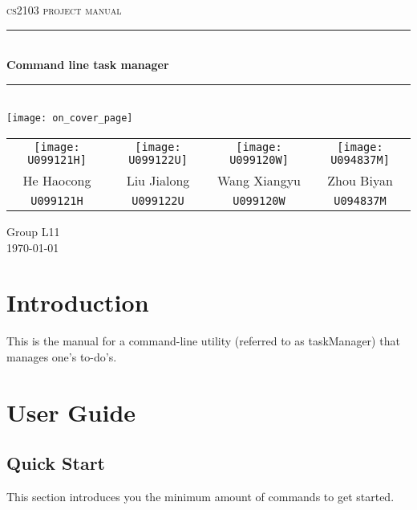 \documentclass[12pt, a4paper]{article}
\begin{document}
\begin{titlepage}
  \centering

  \textsc{\LARGE cs2103 project manual}
  \\[1.5cm]
  \hrule
  \\[0.5cm]
  \Large \bfseries Command line task manager
  \\[0.4cm]
  \hrule
  \\[1.4cm]
  \texttt{[image: on\_cover\_page]}
  \\[1.1cm]

  \begin{tabular}{c | c | c | c}
    \texttt{[image: U099121H]}&
    \texttt{[image: U099122U]}&
    \texttt{[image: U099120W]}&
    \texttt{[image: U094837M]}\\

    \small{He Haocong} & \small{Liu Jialong} & \small{Wang Xiangyu} & \small{Zhou Biyan}\\
    \small{\texttt{U099121H}} & \small{\texttt{U099122U}} & \small{\texttt{U099120W}} & \small{\texttt{U094837M}}\\
  \end{tabular}

  \vfill
  {\large Group L11\\ \today}
\end{titlepage}

\tableofcontents
\newpage

\section{Introduction}
This is the manual for a command-line utility (referred to as taskManager) that manages one's to-do's.

\newpage
\section{User Guide}
\subsection{Quick Start}

This section introduces you the minimum amount of commands to get started.
\end{document}
